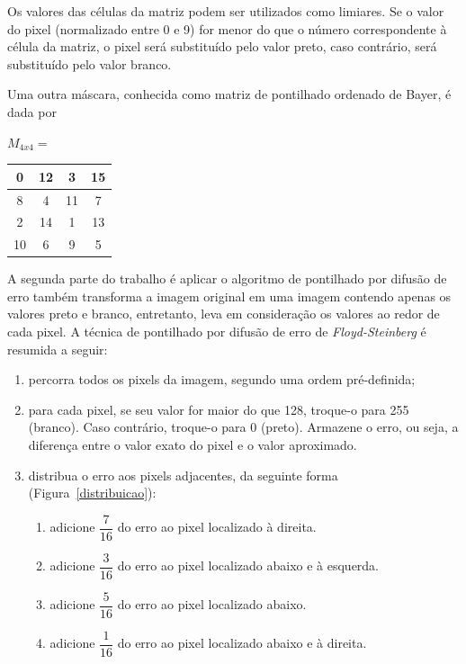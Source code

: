 \documentclass[twoside,twocolumn]{article}
\begin{document}
Os valores das células da matriz podem ser utilizados como limiares. Se o valor do pixel (normalizado entre 0 e 9) for menor do que o número correspondente à célula da matriz, o pixel será substituído pelo valor preto, caso contrário, será substituído pelo valor branco.

Uma outra máscara, conhecida como matriz de pontilhado ordenado de Bayer, é dada por

\vspace{0.3cm}

$M_{4x4} = $ \begin{tabular}{|c|c|c|c|}
\hline
0  & 12 & 3  & 15 \\ \hline
8  & 4  & 11 & 7  \\ \hline
2  & 14 & 1  & 13 \\ \hline
10 & 6  & 9  & 5  \\ \hline
\end{tabular}

\vspace{0.3cm}

A segunda parte do trabalho é aplicar o algoritmo de pontilhado por difusão de erro também transforma a imagem original em uma imagem contendo apenas os valores preto e branco, entretanto, leva em consideração os valores ao redor de cada pixel. A técnica de pontilhado por difusão de erro de \textit{Floyd-Steinberg} é resumida a seguir:

\begin{enumerate}
	\item percorra todos os pixels da imagem, segundo uma ordem pré-definida;
	\item para cada pixel, se seu valor for maior do que 128, troque-o para 255 (branco). Caso contrário, troque-o para 0 (preto). Armazene o erro, ou seja, a diferença entre o valor exato do pixel e o valor aproximado.
	\item distribua o erro aos pixels adjacentes, da seguinte forma (Figura~\ref{distribuicao}):
		\begin{enumerate}
			\item adicione $\dfrac{7}{16}$ do erro ao pixel localizado à direita.
			\item adicione $\dfrac{3}{16}$ do erro ao pixel localizado abaixo e à esquerda.
			\item adicione $\dfrac{5}{16}$ do erro ao pixel localizado abaixo.
			\item adicione $\dfrac{1}{16}$ do erro ao pixel localizado abaixo e à direita.
		\end{enumerate}
\end{enumerate}
\end{document}
